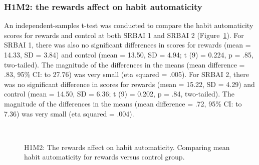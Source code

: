 \subsubsection*{H1M2: the rewards affect on habit automaticity}
An independent-samples t-test was conducted to compare the habit automaticity scores
for rewards and control at both SRBAI 1 and SRBAI 2 (Figure~\ref{fig:m2_h1}). For SRBAI 1, there was also no significant differences in scores for rewards (mean = 14.33, SD = 3.84) and control (mean = 13.50, SD = 4.94; t (9) = 0.224, p = .85,
two-tailed). The magnitude of the differences in the means (mean difference = .83,
95\% CI:  to 27.76) was very small (eta squared = .005). For SRBAI 2, there was no significant difference in scores for rewards
(mean = 15.22, SD = 4.29) and control (mean = 14.50, SD = 6.36; t (9) = 0.202, p = .84,
two-tailed). The magnitude of the differences in the means (mean difference = .72,
95\% CI:  to 7.36) was very small (eta squared = .004).




\begin{figure}[H]
  \centering
  \caption{H1M2: The rewards affect on habit automaticity. Comparing mean habit automaticity for rewards versus control group.}~\label{fig:m2_h1}
\end{figure}


